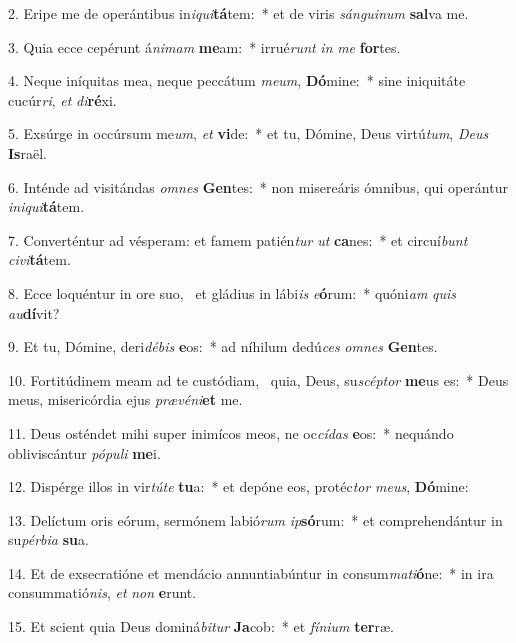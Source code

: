 2. Eripe me de operántibus in\textit{i}\textit{qui}\textbf{tá}tem:~*  et de viris \textit{sán}\textit{gui}\textit{num} \textbf{sal}va me.\

3. Quia ecce cepérunt á\textit{ni}\textit{mam} \textbf{me}am:~*  irrué\textit{runt} \textit{in} \textit{me} \textbf{for}tes.\

4. Neque iníquitas mea, neque peccátum \textit{me}\textit{um}, \textbf{Dó}mine:~*  sine iniquitáte cucúr\textit{ri}, \textit{et} \textit{di}\textbf{ré}xi.\

5. Exsúrge in occúrsum me\textit{um}, \textit{et} \textbf{vi}de:~*  et tu, Dómine, Deus virtú\textit{tum}, \textit{De}\textit{us} \textbf{Is}raël.\

6. Inténde ad visitándas \textit{om}\textit{nes} \textbf{Gen}tes:~*  non misereáris ómnibus, qui operántur \textit{in}\textit{i}\textit{qui}\textbf{tá}tem.\

7. Converténtur ad vésperam: et famem patién\textit{tur} \textit{ut} \textbf{ca}nes:~*  et circuí\textit{bunt} \textit{ci}\textit{vi}\textbf{tá}tem.\

8. Ecce loquéntur in ore suo, \dag\  et gládius in lábi\textit{is} \textit{e}\textbf{ó}rum:~*  quóni\textit{am} \textit{quis} \textit{au}\textbf{dí}vit?\

9. Et tu, Dómine, deri\textit{dé}\textit{bis} \textbf{e}os:~*  ad níhilum dedú\textit{ces} \textit{om}\textit{nes} \textbf{Gen}tes.\

10. Fortitúdinem meam ad te custódiam, \dag\  quia, Deus, su\textit{scép}\textit{tor} \textbf{me}us es:~*  Deus meus, misericórdia ejus \textit{præ}\textit{vé}\textit{ni}\textbf{et} me.\

11. Deus osténdet mihi super inimícos meos, ne oc\textit{cí}\textit{das} \textbf{e}os:~*  nequándo obliviscántur \textit{pó}\textit{pu}\textit{li} \textbf{me}i.\

12. Dispérge illos in vir\textit{tú}\textit{te} \textbf{tu}a:~*  et depóne eos, protéc\textit{tor} \textit{me}\textit{us}, \textbf{Dó}mine:\

13. Delíctum oris eórum, sermónem labió\textit{rum} \textit{ip}\textbf{só}rum:~*  et comprehendántur in su\textit{pér}\textit{bi}\textit{a} \textbf{su}a.\

14. Et de exsecratióne et mendácio annuntiabúntur in consum\textit{ma}\textit{ti}\textbf{ó}ne:~*  in ira consummatió\textit{nis}, \textit{et} \textit{non} \textbf{e}runt.\

15. Et scient quia Deus dominá\textit{bi}\textit{tur} \textbf{Ja}cob:~*  et \textit{fí}\textit{ni}\textit{um} \textbf{ter}ræ.\

